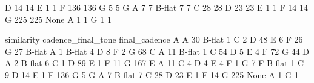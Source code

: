 \documentclass[letterpaper,10pt,english]{sphinxmanual}
\begin{document}
{\begin{sphinxVerbatim}[commandchars=\\\{\}]
                   D                               14                  14
                   E                                1                   1
                   F                              136                 136
                   G                                5                   5
G                  A                                7                   7
                   B-flat                           7                   7
                   C                               28                  28
                   D                               23                  23
                   E                                1                   1
                   F                               14                  14
                   G                              225                 225
None               A                                1                   1
                   G                                1                   1

                                  similarity
cadence\_final\_tone final\_cadence
A                  A                      30
                   B-flat                  1
                   C                       2
                   D                      48
                   E                       6
                   F                      26
                   G                      27
B-flat             A                       1
                   B-flat                  4
                   D                       8
                   F                       2
                   G                      68
C                  A                      11
                   B-flat                  1
                   C                      54
                   D                       5
                   E                       4
                   F                      72
                   G                      44
D                  A                       2
                   B-flat                  6
                   C                       1
                   D                      89
                   E                       1
                   F                      11
                   G                     167
E                  A                      11
                   C                       4
                   D                       4
                   E                       4
                   F                       1
                   G                       7
F                  B-flat                  1
                   C                       9
                   D                      14
                   E                       1
                   F                     136
                   G                       5
G                  A                       7
                   B-flat                  7
                   C                      28
                   D                      23
                   E                       1
                   F                      14
                   G                     225
None               A                       1
                   G                       1
\end{sphinxVerbatim}
}
\end{document}
